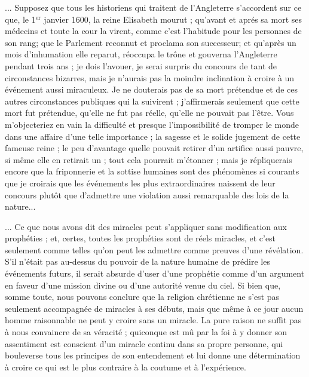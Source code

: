 ... Supposez que tous les historiens qui traitent de
l’Angleterre s’accordent sur ce que, le 1$^\text{er}$ janvier 1600,
la reine Elisabeth mourut ; qu’avant et aprés sa mort
ses médecins et toute la cour la virent, comme c’est l’habitude
pour les personnes de son rang; que le Parlement
reconnut et proclama son successeur; et qu’après un
mois d’inhumation elle reparut, réoccupa le trône et
gouverna l’Angleterre pendant trois ans ; je dois l’avouer,
je serai surpris du concours de tant de circonstances
bizarres, mais je n’aurais pas la moindre inclination à
croire à un événement aussi miraculeux. Je ne douterais
pas de sa mort prétendue et de ces autres circonstances
publiques qui la suivirent ; j’affirmerais seulement que
cette mort fut prétendue, qu’elle ne fut pas réelle, qu’elle
ne pouvait pas l’être. Vous m’objecteriez en vain la difficulté
et presque l’impossibilité de tromper le monde
dans une affaire d’une telle importance ; la sagesse et le
solide jugement de cette fameuse reine ; le peu d’avantage
quelle pouvait retirer d’un artifice aussi pauvre, si même
elle en retirait un ; tout cela pourrait m’étonner ; mais je
répliquerais encore que la friponnerie et la sottise humaines
sont des phénomènes si courants que je croirais que les
événements les plus extraordinaires naissent de leur
concours plutôt que d’admettre une violation aussi remarquable
des lois de la nature...

... Ce que nous avons dit des miracles peut s’appliquer
sans modification aux prophéties ; et, certes, toutes les
prophéties sont de réels miracles, et c’est seulement
comme telles qu’on peut les admettre comme preuves
d'une révélation. S’il n’était pas au-dessus du pouvoir
de la nature humaine de prédire les événements futurs,
il serait absurde d’user d’une prophétie comme d’un argument
en faveur d’une mission divine ou d’une autorité
venue du ciel. Si bien que, somme toute, nous pouvons
conclure que la religion chrétienne ne s’est pas seulement
accompagnée de miracles à ses débuts, mais que même à
ce jour aucun homme raisonnable ne peut y croire sans un
miracle. La pure raison ne suffit pas à nous convaincre de
sa véracité ; quiconque est mû par la foi à y donner son
assentiment est conscient d’un miracle continu dans sa
propre personne, qui bouleverse tous les principes de son
entendement et lui donne une détermination à croire ce
qui est le plus contraire à la coutume et à l’expérience.

